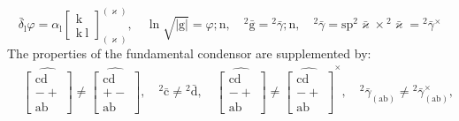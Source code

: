 \documentclass[12pt]{article}
\begin{document}
\begin{itemize}
\begin{equation}
    \end{equation}
    \begin{equation}
    \bar{\delta}_\mathrm{l} \varphi = \alpha_\mathrm{l} \left[ \begin{matrix} \mathrm{k} \\ \mathrm{k\ l} \end{matrix} \right]^{(\varkappa)}_{(\varkappa)}, \quad \ln\sqrt{|\mathrm{g}|} = \varphi;\mathrm{n}, \quad {}^2\bar{\mathrm{g}} = {}^2\bar{\gamma};\mathrm{n}, \quad {}^2\bar{\gamma} = \mathrm{sp}{}^2\bar{\varkappa} \times {}^2\bar{\varkappa} = {}^2\bar{\gamma}^\times \tag{93c}
    \end{equation}
    The properties of the fundamental condensor are supplemented by:
    \begin{equation}
    \begin{aligned}
    & \widehat{\left[ \begin{matrix} \mathrm{cd} \\ - + \\ \mathrm{ab} \end{matrix} \right]} \neq \widehat{\left[ \begin{matrix} \mathrm{cd} \\ + - \\ \mathrm{ab} \end{matrix} \right]}, \quad {}^2\bar{\mathrm{c}} \neq {}^2\bar{\mathrm{d}}, \quad \widehat{\left[ \begin{matrix} \mathrm{cd} \\ - + \\ \mathrm{ab} \end{matrix} \right]} \neq \widehat{\left[ \begin{matrix} \mathrm{cd} \\ - + \\ \mathrm{ab} \end{matrix} \right]}^\times, \quad {}^2\bar{\gamma}_{(\mathrm{ab})} \neq {}^2\bar{\gamma}_{(\mathrm{ab})}^\times, \\

\end{aligned}
\end{equation}
\end{itemize}
\end{document}
